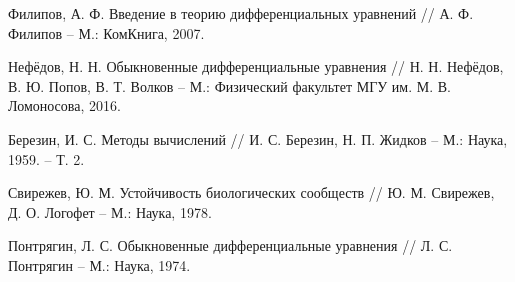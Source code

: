 \begin{thebibliography}{9}
        Филипов, А. Ф. Введение в теорию дифференциальных уравнений // А. Ф. Филипов -- М.: КомКнига, 2007.
    
        Нефёдов, Н. Н. Обыкновенные дифференциальные уравнения // Н. Н. Нефёдов, В. Ю. Попов, В. Т. Волков -- М.: Физический факультет МГУ им. М. В. Ломоносова, 2016.

        Березин, И. С. Методы вычислений // И. С. Березин, Н. П. Жидков -- М.: Наука, 1959. -- Т. 2.
        
        Свирежев, Ю. М. Устойчивость биологических сообществ // Ю. М. Свирежев, Д. О. Логофет -- М.: Наука, 1978.

        Понтрягин, Л. С. Обыкновенные дифференциальные уравнения // Л. С. Понтрягин -- М.: Наука, 1974.


\end{thebibliography}